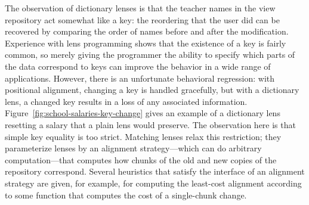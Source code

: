 The observation of dictionary lenses is that the teacher names in the view
repository act somewhat like a key: the reordering that the user did can be
recovered by comparing the order of names before and after the modification.
Experience with lens programming shows that the existence of a key is fairly
common, so merely giving the programmer the ability to specify which parts
of the data correspond to keys can improve the \PUT behavior in a wide range
of applications. However, there is an unfortunate behavioral regression:
with positional alignment, changing a key is handled gracefully, but with a
dictionary lens, a changed key results in a loss of any associated
information. Figure~\ref{fig:school-salaries-key-change} gives an example of
a dictionary lens resetting a salary that a plain lens would preserve. The
observation here is that simple key equality is too strict. Matching lenses
relax this restriction; they parameterize lenses by an alignment
strategy---which can do arbitrary computation---that computes how chunks of
the old and new copies of the repository correspond. Several heuristics that
satisfy the interface of an alignment strategy are given, for example, for
computing the least-cost alignment according to some function that computes
the cost of a single-chunk change.

